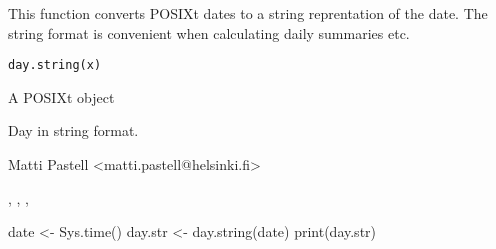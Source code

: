\begin{Description}\relax
This function converts POSIXt dates to a string reprentation of the
date. The string format is convenient when calculating daily summaries etc.
\end{Description}
\begin{Usage}
\begin{verbatim}
day.string(x)
\end{verbatim}
\end{Usage}
\begin{Arguments}
\begin{ldescription}
\item[\code{x}] A POSIXt object
\end{ldescription}
\end{Arguments}
\begin{Value}
Day in string format.
\end{Value}
\begin{Author}\relax
Matti Pastell <matti.pastell@helsinki.fi>
\end{Author}
\begin{SeeAlso}\relax
{}, ,
, 
\end{SeeAlso}
\begin{Examples}
\begin{ExampleCode}
date <- Sys.time()
day.str <- day.string(date)
print(day.str)
\end{ExampleCode}
\end{Examples}

